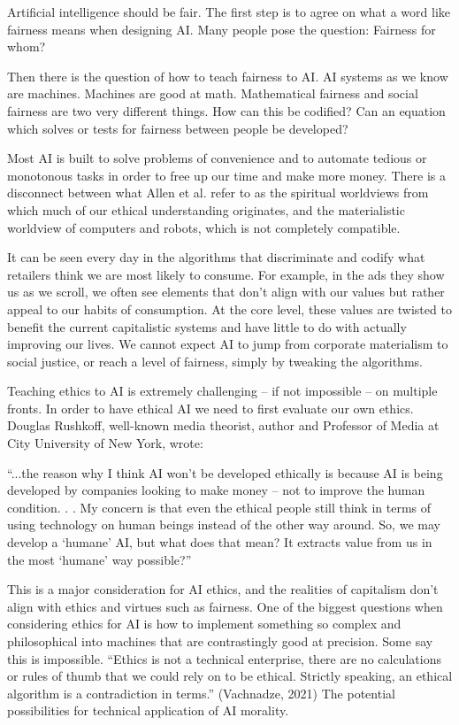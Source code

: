 \documentclass{svproc}
\begin{document}
Artificial intelligence should be fair. The first step is to agree on what a word like fairness means when designing AI. Many people pose the question: Fairness for whom? 

Then there is the question of how to teach fairness to AI. AI systems as we know are machines. Machines are good at math. Mathematical fairness and social fairness are two very different things. How can this be codified? Can an equation which solves or tests for fairness between people be developed?

Most AI is built to solve problems of convenience and to automate tedious or monotonous tasks in order to free up our time and make more money. There is a disconnect between what Allen et al. \cite{Allen2005ArtificialApproaches} refer to as the spiritual worldviews from which much of our ethical understanding originates, and the materialistic worldview of computers and robots, which is not completely compatible. 

It can be seen every day in the algorithms that discriminate and codify what retailers think we are most likely to consume. For example, in the ads they show us as we scroll, we often see elements that don’t align with our values but rather appeal to our habits of consumption. At the core level, these values are twisted to benefit the current capitalistic systems and have little to do with actually improving our lives. We cannot expect AI to jump from corporate materialism to social justice, or reach a level of fairness, simply by tweaking the algorithms.

Teaching ethics to AI is extremely challenging -- if not impossible -- on multiple fronts. In order to have ethical AI we need to first evaluate our own ethics. Douglas Rushkoff, well-known media theorist, author and Professor of Media at City University of New York, wrote: 

\begin{displayquote}
“...the reason why I think AI won’t be developed ethically is because AI is being developed by companies looking to make money – not to improve the human condition. . . My concern is that even the ethical people still think in terms of using technology on human beings instead of the other way around. So, we may develop a ‘humane’ AI, but what does that mean? It extracts value from us in the most ‘humane’ way possible?” \cite{Rainie2021ExpertsDecade.} 
\end{displayquote}

This is a major consideration for AI ethics, and the realities of capitalism don't align with ethics and virtues such as fairness. One of the biggest questions when considering ethics for AI is how to implement something so complex and philosophical into machines that are contrastingly good at precision. Some say this is impossible. “Ethics is not a technical enterprise, there are no calculations or rules of thumb that we could rely on to be ethical. Strictly speaking, an ethical algorithm is a contradiction in terms.” (Vachnadze, 2021) \cite{Vachnadze2021ReinforcementMachines.} The potential possibilities for technical application of AI morality.
\end{document}
